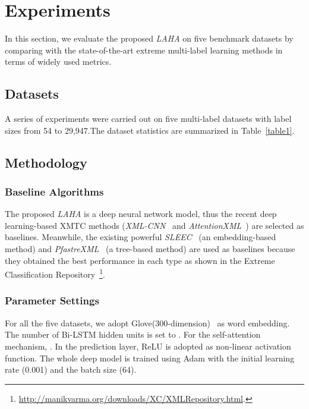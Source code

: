 \documentclass[runningheads]{llncs}
\begin{document}
\section{Experiments}


In this section, we evaluate the proposed \textit{LAHA} on five benchmark datasets by comparing with the state-of-the-art extreme multi-label learning methods in terms of widely used metrics. 



\vspace{-4mm}
\subsection{Datasets}
A series of experiments were carried out on five multi-label datasets with label sizes from 54 to 29,947.The dataset statistics are summarized in Table~\ref{table1}. 


\vspace{-10mm}
\subsection{Methodology}
\subsubsection{Baseline Algorithms}
The proposed \textit{LAHA} is a deep neural network model, thus the recent deep learning-based XMTC methods (\textit{XML-CNN}~\cite{ref_article6} and \textit{AttentionXML}~\cite{ref_article7}) are selected as baselines. 
Meanwhile, the existing powerful 
 \textit{SLEEC}~\cite{ref_article9} (an embedding-based method) and \textit{PfastreXML}~\cite{ref_article10} (a tree-based method) are used as baselines because they obtained the best performance in each type as shown in the Extreme Classification Repository~\footnote{\url{http://manikvarma.org/downloads/XC/XMLRepository.html}.\label{repository}}. 
\vspace{-4mm}
\subsubsection{Parameter Settings}
For all the five datasets, we adopt Glove(300-dimension)~\cite{ref_article12} as word embedding. The number of Bi-LSTM hidden units is set to . For the self-attention mechanism, . In the prediction layer, ReLU is adopted as non-linear activation function. The whole deep model is trained using Adam with the initial learning rate (0.001) and the batch size (64).
\end{document}
